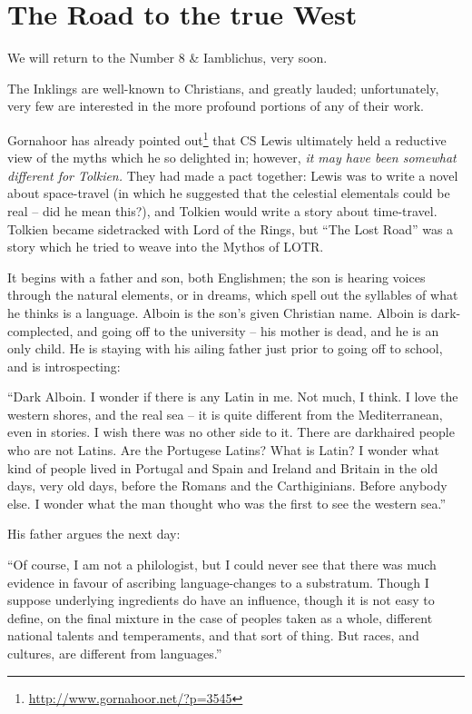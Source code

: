 \section{The Road to the true West}

We will return to the Number 8 \& Iamblichus, very soon.

The Inklings are well-known to Christians, and greatly lauded; unfortunately, very few are interested in the more profound portions of any of their work.

Gornahoor has already pointed out\footnote{\url{http://www.gornahoor.net/?p=3545}} that CS Lewis ultimately held a reductive view of the myths which he so delighted in; however, \emph{it may have been somewhat different for Tolkien.} They had made a pact together: Lewis was to write a novel about space-travel (in which he suggested that the celestial elementals could be real -- did he mean this?), and Tolkien would write a story about time-travel. Tolkien became sidetracked with Lord of the Rings, but ``The Lost Road'' was a story which he tried to weave into the Mythos of LOTR.

It begins with a father and son, both Englishmen; the son is hearing voices through the natural elements, or in dreams, which spell out the syllables of what he thinks is a language. Alboin is the son's given Christian name. Alboin is dark-complected, and going off to the university -- his mother is dead, and he is an only child. He is staying with his ailing father just prior to going off to school, and is introspecting:

\begin{quotex}
``Dark Alboin. I wonder if there is any Latin in me. Not much, I think. I love the western shores, and the real sea -- it is quite different from the Mediterranean, even in stories. I wish there was no other side to it. There are darkhaired people who are not Latins. Are the Portugese Latins? What is Latin? I wonder what kind of people lived in Portugal and Spain and Ireland and Britain in the old days, very old days, before the Romans and the Carthiginians. Before anybody else. I wonder what the man thought who was the first to see the western sea.''
\end{quotex}


His father argues the next day:

\begin{quotex}
``Of course, I am not a philologist, but I could never see that there was much evidence in favour of ascribing language-changes to a substratum. Though I suppose underlying ingredients do have an influence, though it is not easy to define, on the final mixture in the case of peoples taken as a whole, different national talents and temperaments, and that sort of thing. But races, and cultures, are different from languages.''
\end{quotex}


